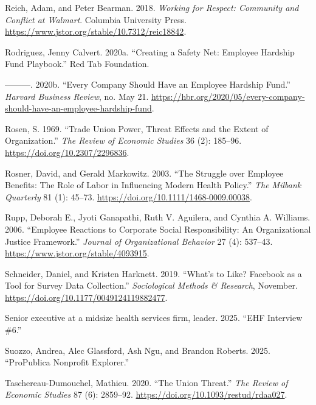 \documentclass[
  11pt,
  oneside]{article}
\newlength{\cslhangindent}
\newenvironment{CSLReferences}[2] %
 {\begin{list}{}{%
  \setlength{\itemindent}{0pt}
  \setlength{\leftmargin}{0pt}
  \setlength{\parsep}{0pt}
  \ifodd #1
   \setlength{\leftmargin}{\cslhangindent}
   \setlength{\itemindent}{-1\cslhangindent}
  \fi
  \setlength{\itemsep}{#2\baselineskip}}}
 {\end{list}}
\begin{document}
\begin{CSLReferences}{1}{0}
Reich, Adam, and Peter Bearman. 2018. \emph{Working for {Respect}: {Community} and {Conflict} at {Walmart}}. Columbia University Press. \url{https://www.jstor.org/stable/10.7312/reic18842}.

Rodriguez, Jenny Calvert. 2020a. {``Creating a {Safety} {Net}: {Employee} {Hardship} {Fund} {Playbook}.''} Red Tab Foundation.

---------. 2020b. {``Every {Company} {Should} {Have} an {Employee} {Hardship} {Fund}.''} \emph{Harvard Business Review}, no. May 21. \url{https://hbr.org/2020/05/every-company-should-have-an-employee-hardship-fund}.

Rosen, S. 1969. {``Trade {Union Power}, {Threat Effects} and the {Extent} of {Organization}.''} \emph{The Review of Economic Studies} 36 (2): 185--96. \url{https://doi.org/10.2307/2296836}.

Rosner, David, and Gerald Markowitz. 2003. {``The {Struggle} over {Employee} {Benefits}: {The} {Role} of {Labor} in {Influencing} {Modern} {Health} {Policy}.''} \emph{The Milbank Quarterly} 81 (1): 45--73. \url{https://doi.org/10.1111/1468-0009.00038}.

Rupp, Deborah E., Jyoti Ganapathi, Ruth V. Aguilera, and Cynthia A. Williams. 2006. {``Employee {Reactions} to {Corporate Social Responsibility}: {An Organizational Justice Framework}.''} \emph{Journal of Organizational Behavior} 27 (4): 537--43. \url{https://www.jstor.org/stable/4093915}.

Schneider, Daniel, and Kristen Harknett. 2019. {``What's to {Like}? {Facebook} as a {Tool} for {Survey} {Data} {Collection}.''} \emph{Sociological Methods \& Research}, November. \url{https://doi.org/10.1177/0049124119882477}.

Senior executive at a midsize health services firm, leader. 2025. {``{EHF} Interview \#6.''}

Suozzo, Andrea, Alec Glassford, Ash Ngu, and Brandon Roberts. 2025. {``{ProPublica Nonprofit Explorer}.''}

Taschereau-Dumouchel, Mathieu. 2020. {``The {Union Threat}.''} \emph{The Review of Economic Studies} 87 (6): 2859--92. \url{https://doi.org/10.1093/restud/rdaa027}.


\end{CSLReferences}
\end{document}
